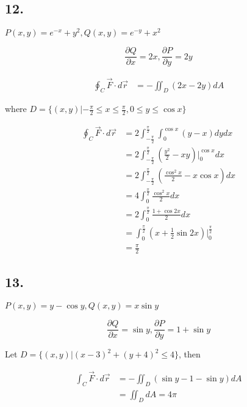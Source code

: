 \documentclass{article}
\begin{document}
  \subsection*{12. }

  $P(x, y) = e^{-x} + y^2, Q(x, y) = e^{-y} + x^2$

  $$\frac{\partial Q}{\partial x} = 2x, \frac{\partial P}{\partial y} = 2y$$


  $$\begin{aligned}
    \oint_{C} \overrightarrow{F} \cdot d\overrightarrow{r} &= -\iint_D (2x-2y) dA
  \end{aligned}$$

  where $D = \{ (x, y) | -\frac \pi 2 \leq x \leq \frac \pi 2, 0 \leq y \leq \cos x \}$

  $$\begin{aligned}
    \oint_C \overrightarrow{F} \cdot d\overrightarrow{r} &= 2\int_{-\frac \pi 2}^{\frac \pi 2} \int_0^{\cos x} (y - x) dy dx \\
    &= 2\int_{-\frac \pi 2}^{\frac \pi 2} (\frac{y^2}{2} - xy)\biggl|_0^{\cos x} dx \\
    &= 2\int_{-\frac \pi 2}^{\frac \pi 2} (\frac{\cos^2 x}{2} - x \cos x) dx \\
    &= 4\int_0^{\frac \pi 2} \frac{\cos^2 x}{2} dx \\
    &= 2\int_0^{\frac \pi 2} \frac{1 + \cos 2x}{2} dx \\
    &= \int_0^{\frac \pi 2} (x + \frac 1 2 \sin 2x)\biggl|_0^{\frac \pi 2} \\
    &= \frac \pi 2
  \end{aligned}$$

  \subsection*{13. }

  $P(x, y) = y - \cos y, Q(x, y) = x \sin y$

  $$\frac{\partial Q}{\partial x} = \sin y, \frac{\partial P}{\partial y} = 1 + \sin y$$

  Let $D = \{ (x, y) | (x-3)^2 + (y+4)^2 \leq 4 \}$, then

  $$\begin{aligned}
    \int_C \overrightarrow{F} \cdot d\overrightarrow{r} &= -\iint_D (\sin y - 1 - \sin y) dA \\
    &= \iint_D dA = 4\pi
  \end{aligned}$$
  
\end{document}
